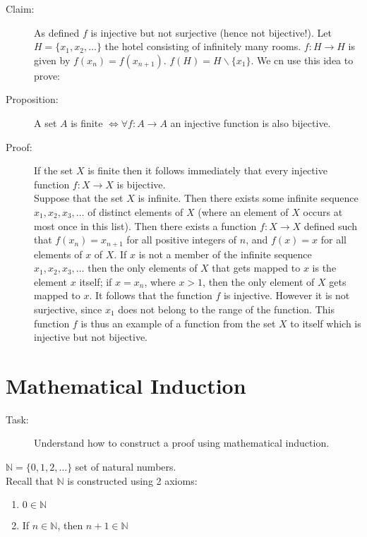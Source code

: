 \documentclass[10pt]{article}
\begin{document}
	\begin{description}
		\item[Claim:] As defined $f$ is injective but not surjective (hence not bijective!). Let $H = \{x_1, x_2,\dots\}$ the hotel consisting of infinitely many rooms. $f: H \rightarrow H$ is given by $f(x_n) = f(x_{n+1})$. $f(H) = H \backslash \{x_1\}$. We cn use this idea to prove:
		\item[Proposition:] A set $A$ is finite $\Leftrightarrow \forall f:A \rightarrow A$ an injective function is also bijective.
		\item[Proof:] If the set $X$ is finite then it follows immediately that every injective function $f:X \rightarrow X$ is bijective. \\
		Suppose that the set $X$ is infinite. Then there exists some infinite sequence $x_1, x_2, x_3, \dots$ of distinct elements of $X$ (where an element of $X$ occurs at most once in this list). Then there exists a function $f:X \rightarrow X$ defined such that $f(x_n) = x_{n+1}$ for all positive integers of $n$, and $f(x) = x$ for all elements of $x$ of $X$. If $x$ is not a member of the infinite sequence $x_1, x_2, x_3, \dots$ then the only elements of $X$ that gets mapped to $x$ is the element $x$ itself; if $x = x_n$, where $x>1$, then the only element of $X$ gets mapped to $x$. It follows that the function $f$ is injective. However it is not surjective, since $x_1$ does not belong to the range of the function. This function $f$ is thus an example of a function from the set $X$ to itself which is injective but not bijective.
	\end{description}
	
	\section{Mathematical Induction}
	\begin{description}
		\item[Task:] Understand how to construct a proof using mathematical induction.
	\end{description}
	$\mathbb{N} = \{0, 1, 2, \dots\}$ set of natural numbers. \\
	Recall that $\mathbb{N}$ is constructed using 2 axioms:
	\begin{enumerate}
		\item $0 \in \mathbb{N}$
		\item If $n \in \mathbb{N}$, then $n+1 \in \mathbb{N}$
	\end{enumerate}
	
\end{document}
